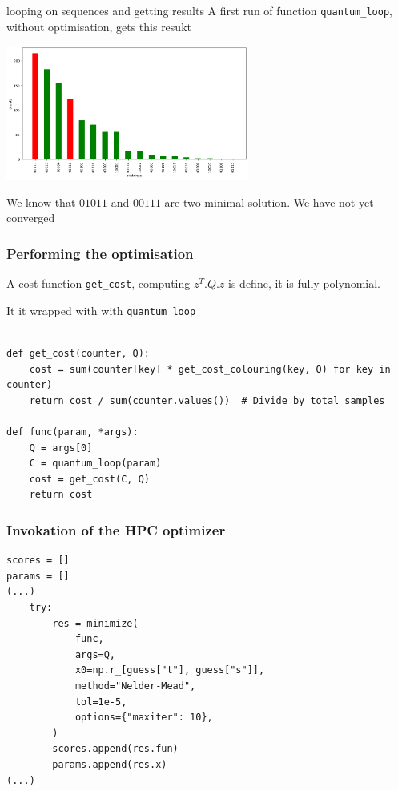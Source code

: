 \begin{frame}{looping on sequences and getting results}
A first run of function \texttt{quantum\_loop}, without optimisation, gets this resukt
\begin{center}
\includegraphics[width=8cm]{images/tutorials_qubo_27_0.png}    
\end{center}
We know that $01011$ and $00111$ are two minimal solution. We have not yet converged
\end{frame}

\begin{frame}[fragile]
\frametitle{Performing the optimisation}
A cost function \texttt{get\_cost}, computing $z^T.Q.z$ is define, it is fully polynomial. 

It it wrapped with  with \texttt{quantum\_loop}
\begin{verbatim}

def get_cost(counter, Q):
    cost = sum(counter[key] * get_cost_colouring(key, Q) for key in counter)
    return cost / sum(counter.values())  # Divide by total samples
    
def func(param, *args):
    Q = args[0]
    C = quantum_loop(param)
    cost = get_cost(C, Q)
    return cost    
\end{verbatim}
\end{frame}

\begin{frame}[fragile]
\frametitle{Invokation of the HPC optimizer}
\begin{verbatim}
scores = []
params = []
(...)
    try:
        res = minimize(
            func,
            args=Q,
            x0=np.r_[guess["t"], guess["s"]],
            method="Nelder-Mead",
            tol=1e-5,
            options={"maxiter": 10},
        )
        scores.append(res.fun)
        params.append(res.x)
(...)
\end{verbatim}    
\end{frame}


